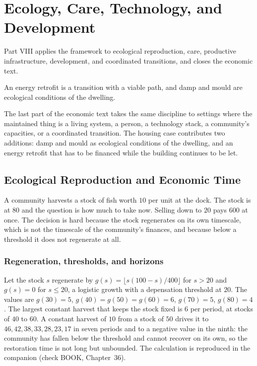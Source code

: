 \part{Ecology, Care, Technology, and Development}
\label{part:VIII}

Part VIII applies the framework to ecological reproduction, care, productive infrastructure, development, and coordinated transitions, and closes the economic text.

\begin{housing}An energy retrofit is a transition with a viable path, and damp and mould are ecological conditions of the dwelling.\end{housing}


The last part of the economic text takes the same discipline to settings where the maintained thing is a living system, a person, a technology stack, a community's capacities, or a coordinated transition. The housing case contributes two additions: damp and mould as ecological conditions of the dwelling, and an energy retrofit that has to be financed while the building continues to be let.

\chapter{Ecological Reproduction and Economic Time}\label{ch:36}

A community harvests a stock of fish worth $10$ per unit at the dock. The stock is at $80$ and the question is how much to take now. Selling down to $20$ pays $600$ at once. The decision is hard because the stock regenerates on its own timescale, which is not the timescale of the community's finances, and because below a threshold it does not regenerate at all.

\section{Regeneration, thresholds, and horizons}

Let the stock $s$ regenerate by $g(s)=\lfloor s(100-s)/400\rfloor$ for $s>20$ and $g(s)=0$ for $s\le 20$, a logistic growth with a depensation threshold at $20$. The values are $g(30)=5$, $g(40)=g(50)=g(60)=6$, $g(70)=5$, $g(80)=4$. The largest constant harvest that keeps the stock fixed is $6$ per period, at stocks of $40$ to $60$. A constant harvest of $10$ from a stock of $50$ drives it to $46,42,38,33,28,23,17$ in seven periods and to a negative value in the ninth: the community has fallen below the threshold and cannot recover on its own, so the restoration time is not long but unbounded. The calculation is reproduced in the companion (check BOOK, Chapter~36).

